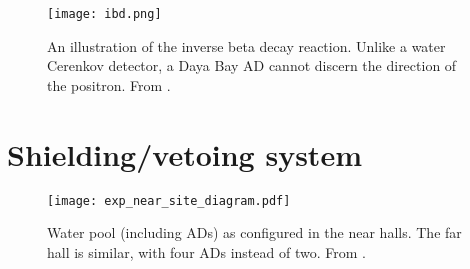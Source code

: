 \documentclass[../thesis.tex]{subfiles}
\begin{document}
\begin{figure}[ht]
  \texttt{[image: ibd.png]}
  \caption{An illustration of the inverse beta decay reaction. Unlike a water
    Cerenkov detector, a Daya Bay AD cannot discern the direction of the
    positron. From \cite{Fernandez_2017}.}
  \label{fig:expIBD}
\end{figure}

\section{Shielding/vetoing system}
\label{sec:expShieldVeto}

\begin{figure}[ht]
  \texttt{[image: exp\_near\_site\_diagram.pdf]}
  \caption{Water pool (including ADs) as configured in the near halls. The far
    hall is similar, with four ADs instead of two. From \cite{An_2017}.}
  \label{fig:expPool}
\end{figure}

\subfilebackmatter
\end{document}
